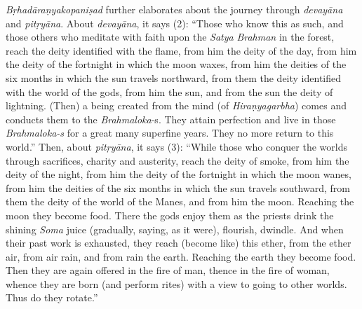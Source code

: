 \emph{Bṛhadāraṇyakopaniṣad} further elaborates about the journey through \emph{devayāna} and \emph{pitṛyāna}. About \emph{devayāna}, it says (2): ``Those who know this as such, and those others who meditate with faith upon the \emph{Satya} \emph{Brahman} in the forest, reach the deity identified with the flame, from him the deity of the day, from him the deity of the fortnight in which the moon waxes, from him the deities of the six months in which the sun travels northward, from them the deity identified with the world of the gods, from him the sun, and from the sun the deity of lightning. (Then) a being created from the mind (of \emph{Hiraṇyagarbha}) comes and conducts them to the \emph{Brahmaloka}-s. They attain perfection and live in those \emph{Brahmaloka-s} for a great many superfine years. They no more return to this world.'' Then, about \emph{pitṛyāna}, it says (3): ``While those who conquer the worlds through sacrifices, charity and austerity, reach the deity of smoke, from him the deity of the night, from him the deity of the fortnight in which the moon wanes, from him the deities of the six months in which the sun travels southward, from them the deity of the world of the Manes, and from him the moon. Reaching the moon they become food. There the gods enjoy them as the priests drink the shining \emph{Soma} juice (gradually, saying, as it were), flourish, dwindle. And when their past work is exhausted, they reach (become like) this ether, from the ether air, from air rain, and from rain the earth. Reaching the earth they become food. Then they are again offered in the fire of man, thence in the fire of woman, whence they are born (and perform rites) with a view to going to other worlds. Thus do they rotate.''

